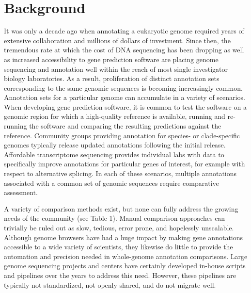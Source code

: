 \section{Background}
It was only a decade ago when annotating a eukaryotic genome required years of extensive collaboration and millions of dollars of investment.
Since then, the tremendous rate at which the cost of DNA sequencing has been dropping as well as increased accessibility to gene prediction software are placing genome sequencing and annotation well within the reach of most single investigator biology laboratories.
As a result, proliferation of distinct annotation sets corresponding to the same genomic sequences is becoming increasingly common.
Annotation sets for a particular genome can accumulate in a variety of scenarios.
When developing gene prediction software, it is common to test the software on a genomic region for which a high-quality reference is available, running and re-running the software and comparing the resulting predictions against the reference.
Community groups providing annotation for species- or clade-specific genomes typically release updated annotations following the initial release.
Affordable transcriptome sequencing provides individual labs with data to specifically improve annotations for particular genes of interest, for example with respect to alternative splicing.
In each of these scenarios, multiple annotations associated with a common set of genomic sequences require comparative assessment.

A variety of comparison methods exist, but none can fully address the growing needs of the community (see Table 1).
Manual comparison approaches can trivially be ruled out as slow, tedious, error prone, and hopelessly unscalable.
Although genome browsers have had a huge impact by making gene annotations accessible to a wide variety of scientists, they likewise do little to provide the automation and precision needed in whole-genome annotation comparisons.
Large genome sequencing projects and centers have certainly developed in-house scripts and pipelines over the years to address this need.
However, these pipelines are typically not standardized, not openly shared, and do not migrate well.

